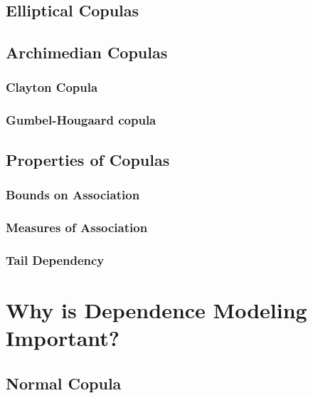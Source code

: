\documentclass[]{book}
\theoremstyle{definition}
\theoremstyle{definition}
\theoremstyle{definition}
\theoremstyle{remark}
\begin{document}
\subsection{Elliptical Copulas}\label{elliptical-copulas}

\subsection{Archimedian Copulas}\label{archimedian-copulas}

\subsubsection{Clayton Copula}\label{clayton-copula}

\subsubsection{Gumbel-Hougaard copula}\label{gumbel-hougaard-copula}

\subsection{Properties of Copulas}\label{properties-of-copulas}

\subsubsection{Bounds on Association}\label{bounds-on-association}

\subsubsection{Measures of Association}\label{measures-of-association}

\subsubsection{Tail Dependency}\label{tail-dependency}

\section{Why is Dependence Modeling Important?}\label{S:CopImp}

\subsection{Normal Copula}\label{normal-copula}
\end{document}
